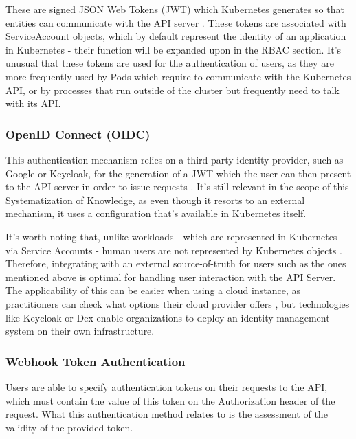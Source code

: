 \documentclass[a4paper,11pt,openright,BCOR=15mm]{scrbook}
\begin{document}
These are signed JSON Web Tokens (JWT) which Kubernetes generates so that entities can communicate with the API server \cite{the_linux_foundation_authenticating_2024}. These tokens are associated with ServiceAccount objects, which by default represent the identity of an application in Kubernetes \cite{martin_hacking_2021} - their function will be expanded upon in the RBAC section. It's unusual that these tokens are used for the authentication of users, as they are more frequently used by Pods which require to communicate with the Kubernetes API, or by processes that run outside of the cluster but frequently need to talk with its API.

\subsubsection{OpenID Connect (OIDC)}

This authentication mechanism relies on a third-party identity provider, such as Google or Keycloak, for the generation of a JWT which the user can then present to the API server in order to issue requests \cite{the_linux_foundation_authenticating_2024}. It's still relevant in the scope of this Systematization of Knowledge, as even though it resorts to an external mechanism, it uses a configuration that's available in Kubernetes itself.

It's worth noting that, unlike workloads - which are represented in Kubernetes via Service Accounts - human users are not represented by Kubernetes objects \cite{the_linux_foundation_authenticating_2024,martin_hacking_2021}. Therefore, integrating with an external source-of-truth for users such as the ones mentioned above is optimal for handling user interaction with the API Server. The applicability of this can be easier when using a cloud instance, as practitioners can check what options their cloud provider offers \cite{martin_hacking_2021}, but technologies like Keycloak or Dex enable organizations to deploy an identity management system on their own infrastructure.

\subsubsection{Webhook Token Authentication}

Users are able to specify authentication tokens on their requests to the API, which must contain the value of this token on the Authorization header of the request. What this authentication method relates to is the assessment of the validity of the provided token.
\end{document}
